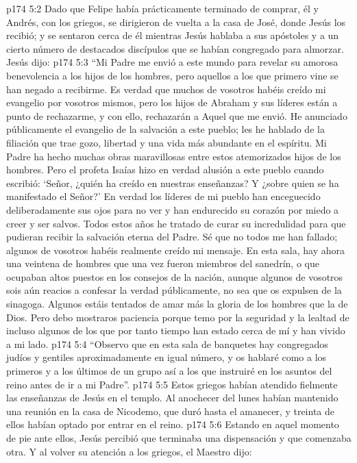 \vs p174 5:2 Dado que Felipe había prácticamente terminado de comprar, él y Andrés, con los griegos, se dirigieron de vuelta a la casa de José, donde Jesús los recibió; y se sentaron cerca de él mientras Jesús hablaba a sus apóstoles y a un cierto número de destacados discípulos que se habían congregado para almorzar. Jesús dijo:
\vs p174 5:3 \pc “Mi Padre me envió a este mundo para revelar su amorosa benevolencia a los hijos de los hombres, pero aquellos a los que primero vine se han negado a recibirme. Es verdad que muchos de vosotros habéis creído mi evangelio por vosotros mismos, pero los hijos de Abraham y sus líderes están a punto de rechazarme, y con ello, rechazarán a Aquel que me envió. He anunciado públicamente el evangelio de la salvación a este pueblo; les he hablado de la filiación que trae gozo, libertad y una vida más abundante en el espíritu. Mi Padre ha hecho muchas obras maravillosas entre estos atemorizados hijos de los hombres. Pero el profeta Isaías hizo en verdad alusión a este pueblo cuando escribió: ‘Señor, ¿quién ha creído en nuestras enseñanzas? Y ¿sobre quien se ha manifestado el Señor?’ En verdad los líderes de mi pueblo han enceguecido deliberadamente sus ojos para no ver y han endurecido su corazón por miedo a creer y ser salvos. Todos estos años he tratado de curar su incredulidad para que pudieran recibir la salvación eterna del Padre. Sé que no todos me han fallado; algunos de vosotros habéis realmente creído mi mensaje. En esta sala, hay ahora una veintena de hombres que una vez fueron miembros del sanedrín, o que ocupaban altos puestos en los consejos de la nación, aunque algunos de vosotros sois aún reacios a confesar la verdad públicamente, no sea que os expulsen de la sinagoga. Algunos estáis tentados de amar más la gloria de los hombres que la de Dios. Pero debo mostraros paciencia porque temo por la seguridad y la lealtad de incluso algunos de los que por tanto tiempo han estado cerca de mí y han vivido a mi lado.
\vs p174 5:4 “Observo que en esta sala de banquetes hay congregados judíos y gentiles aproximadamente en igual número, y os hablaré como a los primeros y a los últimos de un grupo así a los que instruiré en los asuntos del reino antes de ir a mi Padre”.
\vs p174 5:5 Estos griegos habían atendido fielmente las enseñanzas de Jesús en el templo. Al anochecer del lunes habían mantenido una reunión en la casa de Nicodemo, que duró hasta el amanecer, y treinta de ellos habían optado por entrar en el reino.
\vs p174 5:6 Estando en aquel momento de pie ante ellos, Jesús percibió que terminaba una dispensación y que comenzaba otra. Y al volver su atención a los griegos, el Maestro dijo:

